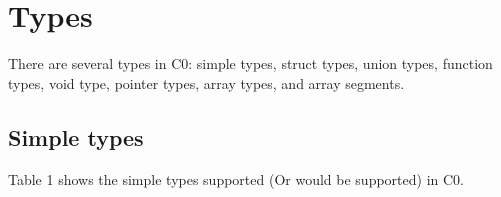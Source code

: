 \documentclass[a4paper]{article}
\begin{document}
\section{Types}
There are several types in C0: simple types, struct types, union types, function types, void type, pointer types, array types, and array segments.

\subsection{Simple types}
Table 1 shows the simple types supported (Or would be supported) in C0.
\end{document}
